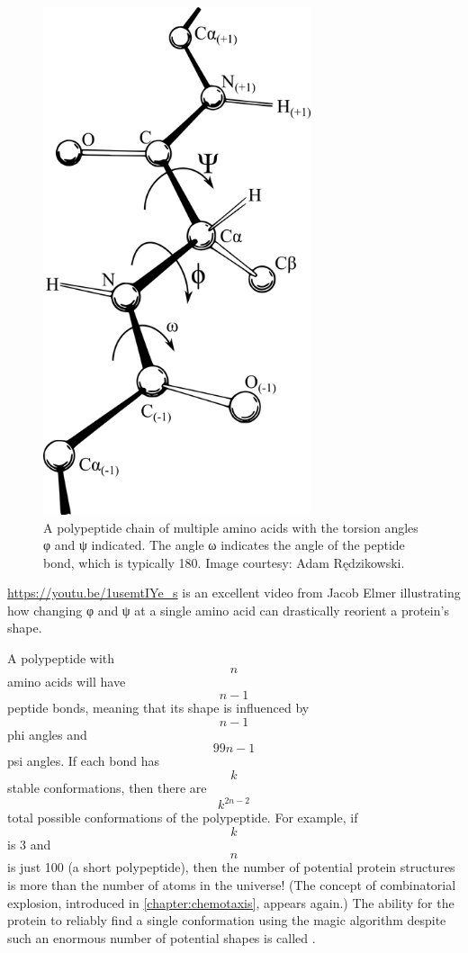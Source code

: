 \begin{figure}[h]
	\centering
	\mySfFamily
	\includegraphics[width = 0.7\textwidth]{../images/torsion_angles.png}
	\caption{A polypeptide chain of multiple amino acids with the torsion angles φ and ψ indicated. The angle ω indicates the angle of the peptide bond, which is typically 180\textdegree. Image courtesy: Adam Rędzikowski.}
	\label{fig:torsion_angles}
\end{figure}

\url{https://youtu.be/1usemtIYe_s} is an excellent video from Jacob Elmer illustrating how changing φ and ψ at a single amino acid can drastically reorient a protein's shape.

A polypeptide with $$n$$ amino acids will have $$n - 1$$ peptide bonds, meaning that its shape is influenced by $$n - 1$$ phi angles and $$99 n - 1$$ psi angles. If each bond has $$k$$ stable conformations, then there are $$k^{2n-2}$$ total possible conformations of the polypeptide. For example, if $$k$$ is 3 and $$n$$ is just 100 (a short polypeptide), then the number of potential protein structures is more than the number of atoms in the universe! (The concept of combinatorial explosion, introduced in \autoref{chapter:chemotaxis}, appears again.) The ability for the protein to reliably find a single conformation using the magic algorithm despite such an enormous number of potential shapes is called .

